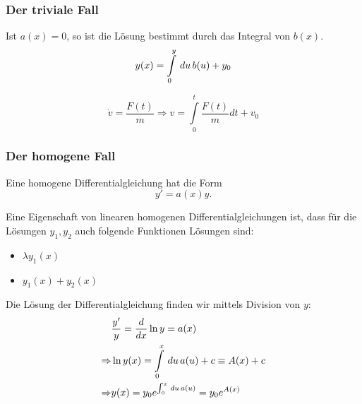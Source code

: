 \subsubsection{Der triviale Fall}
Ist $a(x) = 0$, so ist die Lösung bestimmt durch das
Integral von $b(x)$.
\begin{equation}
y(x) = \int \limits_{0}^{y} \,du\, b(u) + y_0
\end{equation}

\begin{Beispiel}
\begin{equation*}
\dot{v} = \frac{F(t)}{m} \Rightarrow v = \int \limits_{0}^{t} \frac{F(t)}{m} dt
+ v_0
\end{equation*}
\end{Beispiel}

\subsubsection{Der homogene Fall}
Eine homogene Differentialgleichung hat die Form
\begin{equation}
y' = a(x)y.
\end{equation}

\begin{Bemerkung}
 Eine Eigenschaft von linearen homogenen Differentialgleichungen ist, dass für die Lösungen $y_1, y_2$ auch folgende Funktionen Lösungen sind:
\begin{itemize}
 \item $\lambda y_1(x)$
 \item $y_1(x)+y_2(x)$
\end{itemize}
\end{Bemerkung}

Die Lösung der Differentialgleichung finden wir mittels Division von $y$:
\begin{align*}
 & \frac{y'}{y} = \frac{d}{dx} \ln{y} = a(x)\\
\Rightarrow & \ln{y(x)} = \int \limits_{0}^{x} \,du\, a(u) + c \equiv A(x)+c\\
\Rightarrow & y(x) = y_0 e^{\int_0^{x}\,du\, a(u)} = y_0 e^{A(x)}
\end{align*}

